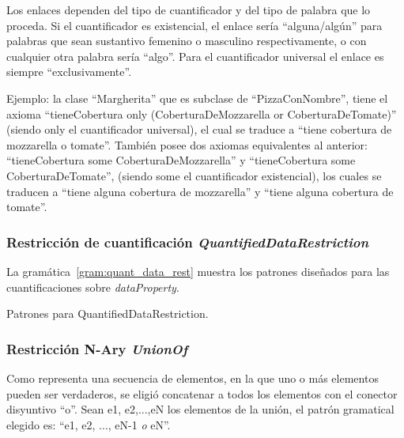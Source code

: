 Los enlaces dependen del tipo de cuantificador y del tipo de palabra que lo proceda. Si el cuantificador es existencial, el enlace sería ``alguna/algún'' para palabras que sean sustantivo femenino o masculino respectivamente, o con cualquier otra palabra sería ``algo''.  Para el cuantificador universal el enlace es siempre ``exclusivamente''.

Ejemplo: la clase ``Margherita'' que es subclase de ``PizzaConNombre'', tiene el axioma ``tieneCobertura only 
    (CoberturaDeMozzarella or CoberturaDeTomate)'' (siendo only el cuantificador universal), el cual se traduce a ``tiene cobertura de mozzarella o tomate''. También posee dos axiomas equivalentes al anterior: ``tieneCobertura some CoberturaDeMozzarella'' y ``tieneCobertura some CoberturaDeTomate'', (siendo some el cuantificador existencial), los cuales se traducen a ``tiene alguna cobertura de mozzarella'' y ``tiene alguna cobertura de tomate''.


\subsubsection{Restricción de cuantificación \emph{QuantifiedDataRestriction}}
La gramática~\ref{gram:quant_data_rest} muestra los patrones diseñados para las cuantificaciones sobre \emph{dataProperty}.

\begin{GrammarEnv}
\begin{grammar}
\end{grammar}
\caption{Patrones para QuantifiedDataRestriction.}\label{gram:quant_data_rest}
\end{GrammarEnv}

\subsubsection{Restricción N-Ary \emph{UnionOf}} 
Como representa una secuencia de elementos, en la que uno o más elementos pueden ser verdaderos, se eligió concatenar a todos los elementos con el conector disyuntivo ``o''. Sean e1, e2,...,eN los elementos de la unión, el patrón gramatical elegido es: ``e1, e2, ..., eN-1 \emph{o} eN''.

